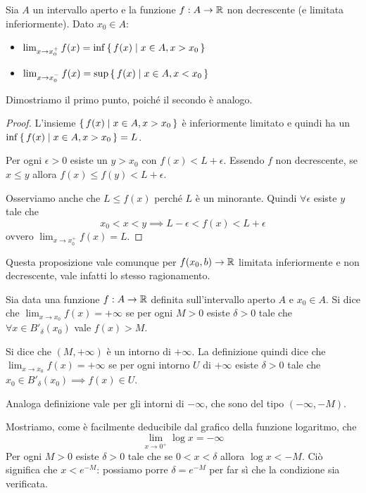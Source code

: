\begin{proposition}
Sia $A$ un intervallo aperto e la funzione $f : A \to \mathbb R$ non decrescente (e limitata inferiormente). Dato $x_0 \in A$:
\begin{itemize}
\item $\lim_{x \to x_0^+} f(x) = \inf \set{f(x) | x \in A, x > x_0}$
\item $\lim_{x \to x_0^-} f(x) = \sup \set{f(x) | x \in A, x < x_0}$
\end{itemize}
\end{proposition}

Dimostriamo il primo punto, poiché il secondo è analogo.
\begin{proof}
L'insieme $\set{f(x) | x \in A, x > x_0}$ è inferiormente limitato e quindi ha un $\inf \set{f(x) | x \in A, x > x_0} = L$.

Per ogni $\epsilon > 0$ esiste un $y > x_0$ con $f(x) < L + \epsilon$. Essendo $f$ non decrescente, se $x \le y$ allora $f(x) \le f(y) < L + \epsilon$.

Osserviamo anche che $L \le f(x)$ perché $L$ è un minorante. Quindi $\forall \epsilon$ esiste $y$ tale che
\begin{equation*}
x_0 < x < y \implies L - \epsilon < f(x) < L + \epsilon
\end{equation*}
ovvero $\lim_{x \to x_0^+} f(x) = L$.
\end{proof}

Questa proposizione vale comunque per $f(x_0, b) \to \mathbb R$ limitata inferiormente e non decrescente, vale infatti lo stesso ragionamento.

\begin{definition}
Sia data una funzione $f: A \to \mathbb R$ definita sull'intervallo aperto $A$ e $x_0 \in A$. Si dice che $\lim_{x \to x_0} f(x) = +\infty$ se per ogni $M > 0$ esiste $\delta > 0$ tale che $\forall x \in B'_\delta (x_0)$ vale $f(x) > M$.
\end{definition}

Si dice che $(M, +\infty)$ è un intorno di $+\infty$. La definizione quindi dice che $\lim_{x \to x_0} f(x) = +\infty$ se per ogni intorno $U$ di $+\infty$ esiste $\delta > 0$ tale che $x_0 \in B'_\delta (x_0) \implies f(x) \in U$.

Analoga definizione vale per gli intorni di $-\infty$, che sono del tipo $(-\infty, -M)$.

\begin{example}
Mostriamo, come è facilmente deducibile dal grafico della funzione logaritmo, che
\begin{equation*}
\lim_{x \to 0^+} \log x = -\infty
\end{equation*}
Per ogni $M > 0$ esiste $\delta > 0$ tale che se $0 < x < \delta$ allora $\log x < -M$. Ciò significa che $x < e^{-M}$: possiamo porre $\delta = e^{-M}$ per far sì che la condizione sia verificata.
\end{example}

